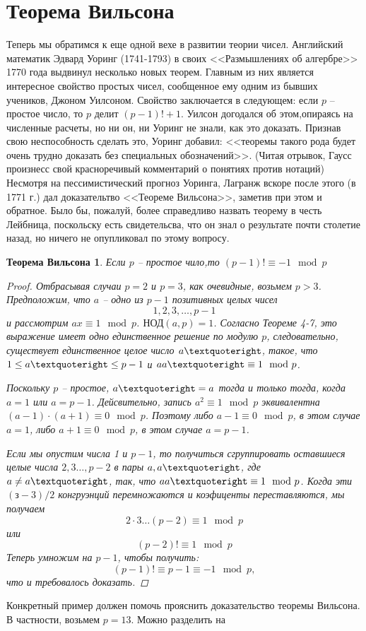\documentclass[4apaper,11pt]{article}
\newtheorem*{theorem}{Теорема Вильсона}
\begin{document}
\section{Теорема Вильсона}
Теперь мы обратимся к еще одной вехе в развитии теории чисел. Английский математик Эдвард Уоринг (1741-1793) в своих <<Размышлениях об алгербре>> 1770 года выдвинул несколько новых теорем. Главным из них является интересное свойство простых чисел, сообщенное ему одним из бывших учеников,  Джоном Уилсоном. Свойство заключается в следующем: если $p$ -- простое число, то $p$ делит $(p-1)!+1$. Уилсон догодался об этом,опираясь на численные расчеты, но ни он, ни Уоринг не знали, как это доказать. Признав свою неспособность сделать это, Уоринг добавил: <<теоремы такого рода будет очень трудно доказать без специальных обозначений>>. (Читая отрывок, Гаусс произнесс свой красноречивый комментарий о понятиях против нотаций)	Несмотря на пессимистический прогноз Уоринга, Лагранж вскоре после этого (в 1771 г.) дал доказательтво <<Теореме Вильсона>>, заметив при этом и обратное. Было бы, пожалуй, более справедливо назвать теорему в честь Лейбница, поскольску есть свидетельсва, что он знал о результате почти столетие назад, но ничего не опупликовал по этому вопросу.
\begin{theorem}
Если $p$ -- простое чило,то $(p-1)!\equiv -1\mod p$	
	\begin{proof}
	Отбрасывая случаи $p=2$ и $p=3$, как очевидные, возьмем $p>3$. Предположим, что $a$ -- одно из $p-1$ позитивных целых чисел 
	\[1, 2, 3,\dots, p-1\]
	и рассмотрим $ax\equiv 1\mod p$. $\text{НОД}(a,p)=1$. Согласно Теореме 4-7, это выражение имеет одно единственное решение по модулю $p$, следовательно, существует единственное целое число $a\textquoteright$, такое, что $1\leq a\textquoteright\leq p-1$ и $a a\textquoteright \equiv 1\mod p$.
	
	Поскольку $p$ -- простое, $a\textquoteright=a$ тогда и только тогда, когда $a=1$ или $a=p-1$. Дейсвительно, запись $a^2\equiv 1\mod p$ эквивалентна $(a-1)\cdot(a+1)\equiv 0\mod p$. Поэтому либо $a-1\equiv 0\mod p$,  в этом случае $a=1$, либо $a+1\equiv0\mod p$, в этом случае $a=p-1$.
	
	Если мы опустим числа 1 и $p-1$, то получиться сгруппировать оставшиеся целые числа $2,3\dots,p-2$ в пары $a,a\textquoteright$, где $a\neq a\textquoteright$, так, что $aa\textquoteright\equiv 1\mod p$. Когда эти $(з-3)/2$ конгруэнций перемножаются и коэфиценты переставляются, мы получаем
	\[2\cdot3\dots(p-2)\equiv 1\mod p\] или
	\[(p-2)!\equiv 1\mod p\]
	Теперь умножим на $p-1$, чтобы получить:
	\[(p-1)!\equiv p-1\equiv -1\mod p,\] 
	что и требовалось доказать.
	\end{proof}
\end{theorem}
Конкретный пример должен помочь прояснить доказательство теоремы Вильсона. В частности, возьмем $p=13$. Можно разделить на 
\end{document}
